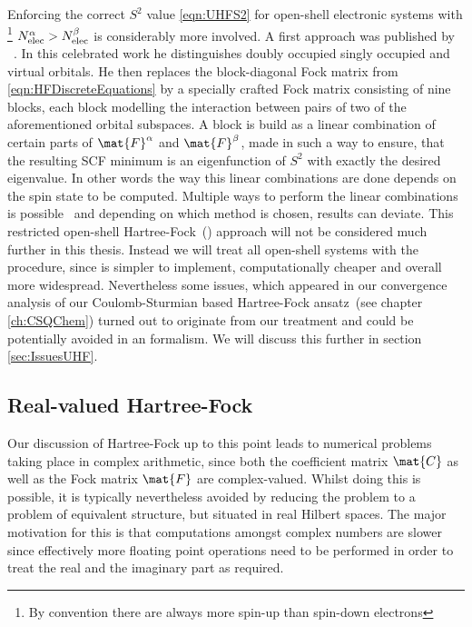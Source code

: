 Enforcing the correct $S^2$ value \eqref{eqn:UHFS2}
for open-shell electronic systems
with%
\footnote{By convention there are always more spin-up than spin-down electrons}
$N_\text{elec}^\alpha > N_\text{elec}^\beta$
is considerably more involved.
A first approach was published by \citeauthor{Roothaan1960}
~\cite{Roothaan1960,Alder1963}.
In this celebrated work he
distinguishes doubly occupied singly occupied and virtual orbitals.
He then replaces the
block-diagonal Fock matrix from \eqref{eqn:HFDiscreteEquations}
by a specially crafted Fock matrix
consisting of nine blocks,
each block modelling the interaction between pairs of two
of the aforementioned orbital subspaces.
A block is build as a linear combination
of certain parts of $\mat{F}^\alpha$ and $\mat{F}^\beta$,
made in such a way to ensure,
that the resulting SCF minimum is an eigenfunction of $S^2$
with exactly the desired eigenvalue.
In other words the way this linear combinations are done
depends on the spin state to be computed.
Multiple ways to perform the linear combinations is possible~\cite{Glaesemann2010}
and depending on which method is chosen, results can deviate.
This restricted open-shell Hartree-Fock~(\ROHF) approach
will not be considered much further in this thesis.
Instead we will treat all open-shell systems with the \UHF procedure,
since \UHF is simpler to implement, computationally cheaper and overall more widespread.
Nevertheless some issues,
which appeared in our convergence analysis of our
Coulomb-Sturmian based Hartree-Fock ansatz~(see chapter \vref{ch:CSQChem})
turned out to originate from our \UHF treatment
and could be potentially avoided in an \ROHF formalism.
We will discuss this further in section \vref{sec:IssuesUHF}.

\subsection{Real-valued Hartree-Fock}
Our discussion of Hartree-Fock up to this point
leads to numerical problems taking place in complex arithmetic,
since both the coefficient matrix $\mat{C}$
as well as the Fock matrix $\mat{F}$ are complex-valued.
Whilst doing this is possible,
it is typically nevertheless
avoided by reducing
the \HF problem to a problem of equivalent structure,
but situated in real Hilbert spaces.
The major motivation for this is that computations
amongst complex numbers are slower since effectively
more floating point operations need to be performed
in order to treat the real and the imaginary part as required.

